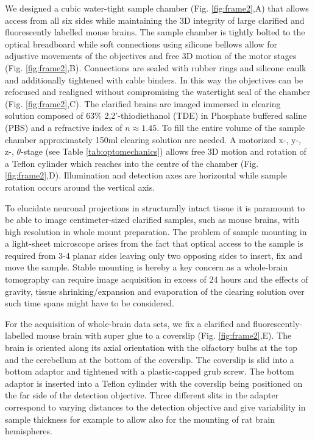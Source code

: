 \documentclass[12pt]{spieman}  %
\begin{document}
\begin{spacing}{2}
We designed a cubic water-tight sample chamber (Fig. \ref{fig:frame2},A) that allows access from all six sides while maintaining the 3D integrity of large clarified and fluorescently labelled mouse brains. The sample chamber is tightly bolted  to the optical breadboard while soft connections using silicone bellows allow for adjustive movements of the objectives and free 3D motion of the motor stages (Fig. \ref{fig:frame2},B). Connections are sealed with rubber rings and silicone caulk and additionally tightened with cable binders. In this way the objectives can be refocused and realigned without compromising the watertight seal of the chamber (Fig. \ref{fig:frame2},C). The clarified brains are imaged immersed in clearing solution composed of 63\% 2,2'-thiodiethanol (TDE) in Phosphate buffered saline (PBS) and a refractive index of $n \approx 1.45$\cite{Costantini}. To fill the entire volume of the sample chamber approximately 150ml clearing solution are needed. A motorized x-, y-, z-, $\theta$-stage (see Table \ref{tab:optomechanics}) allows free 3D motion and rotation of a Teflon cylinder which reaches into the centre of the chamber (Fig. \ref{fig:frame2},D). Illumination and detection axes are horizontal while sample rotation occurs around the vertical axis.		
		
To elucidate neuronal projections in structurally intact tissue it is paramount to be able to image centimeter-sized clarified samples, such as mouse brains, with high resolution in whole mount preparation. The problem of sample mounting in a light-sheet microscope arises from the fact that optical access to the sample is required from 3-4 planar sides leaving only two opposing sides to insert, fix and move the sample. Stable mounting is hereby a key concern as a whole-brain tomography can require image acquisition in excess of 24 hours and the effects of gravity, tissue shrinking/expansion and evaporation of the clearing solution over such time spans might have to be considered. 

For the acquisition of whole-brain data sets, we fix a clarified and fluorescently-labelled mouse brain with super glue to a coverslip (Fig. \ref{fig:frame2},E). The brain is oriented along its axial orientation with the olfactory bulbs at the top and the cerebellum at the bottom of the coverslip. The coverslip is slid into a bottom adaptor and tightened with a plastic-capped grub screw. The bottom adaptor is inserted into a Teflon cylinder with the coverslip being positioned on the far side of the detection objective. Three different slits in the adapter correspond to varying distances to the detection objective and give variability in sample thickness for example to allow also for the mounting of rat brain hemispheres.
	

\end{spacing}
\end{document}
